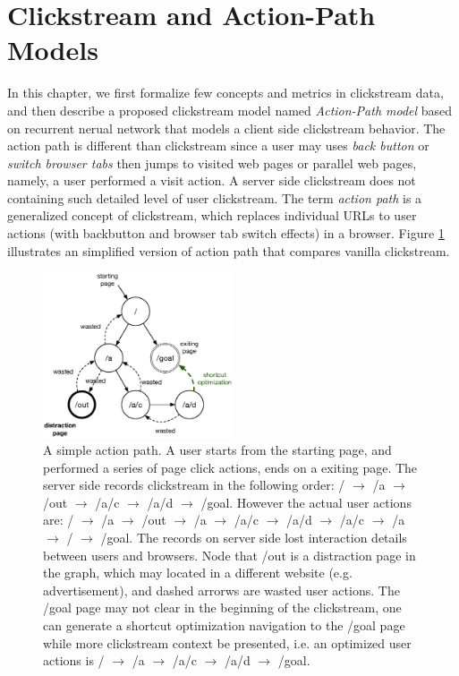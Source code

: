 \section{Clickstream and Action-Path Models}
\label{ch:model}

In this chapter, we first formalize few concepts and metrics in clickstream data,
and then describe a proposed clickstream model named \emph{Action-Path model} 
based on recurrent nerual network that models a client side clickstream behavior. 
The action path is different than clickstream since 
a user may uses \emph{back button} or \emph{switch browser tabs} then jumps to visited web pages 
or parallel web pages, namely, a user performed a visit action.
A server side clickstream does not containing such detailed level of user clickstream. 
The term \emph{action path} is a generalized concept of clickstream, which replaces individual URLs 
to user actions (with backbutton and browser tab switch effects) in a browser. Figure \ref{fig:clickstream}
illustrates an simplified version of action path that compares vanilla clickstream.

\begin{figure}[H]
    \centering
    \includegraphics[width=0.5\textwidth]{figures/clickstream}
    \caption{A simple action path. A user starts from the starting page, and performed
    a series of page click actions, ends on a exiting page. 
    The server side records clickstream in the following order:
    / $\rightarrow$ /a $\rightarrow$ /out $\rightarrow$ /a/c $\rightarrow$ /a/d $\rightarrow$ /goal.
    However the actual user actions are: 
    / $\rightarrow$ /a $\rightarrow$ /out $\rightarrow$ /a $\rightarrow$ /a/c $\rightarrow$ /a/d 
    $\rightarrow$ /a/c $\rightarrow$ /a $\rightarrow$ / $\rightarrow$ /goal. 
    The records on server side lost interaction details between users and browsers.
    Node that /out is a distraction page in the graph, 
    which may located in a different website (e.g. advertisement), 
    and dashed arrorws are wasted user
    actions. The /goal page may not clear in the beginning of the clickstream, one can generate
    a shortcut optimization navigation to the /goal page while more clickstream context
    be presented, i.e. an optimized user actions is 
    / $\rightarrow$ /a $\rightarrow$ /a/c $\rightarrow$ /a/d $\rightarrow$ /goal.}
    \label{fig:clickstream}
\end{figure}

